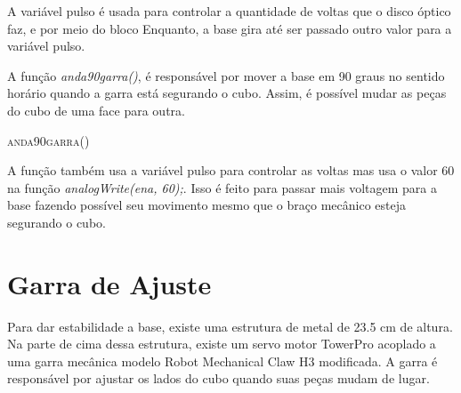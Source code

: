  A variável pulso é usada para controlar a quantidade de voltas que o disco óptico faz, e por meio do bloco Enquanto, a base gira até ser passado outro valor para a variável pulso.
 
 A função \textit{anda90garra()}, é responsável por mover a base em 90 graus no sentido horário quando a garra está segurando o cubo. Assim, é possível mudar as peças do cubo de uma face para outra.
 
 \begin{algorithm}[H]
   \SetAlgoLined
   \label{alg1}
   \caption{\textsc{anda90garra()}}
 \end{algorithm}
   
   A função também usa a variável pulso para controlar as voltas mas usa o valor 60 na função \textit{analogWrite(ena, 60);}. Isso é feito para passar mais voltagem para a base fazendo possível seu movimento mesmo que o braço mecânico esteja segurando o cubo.

\section{Garra de Ajuste}

Para dar estabilidade a  base, existe uma estrutura de metal de 23.5 cm de altura. Na parte de cima dessa estrutura, existe um servo motor TowerPro acoplado a uma garra mecânica modelo Robot Mechanical Claw H3 modificada.  A garra é responsável por ajustar os lados do cubo quando suas peças mudam de lugar. 

